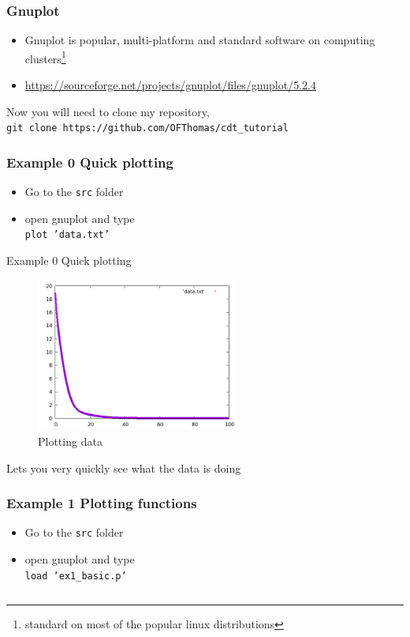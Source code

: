 \documentclass{beamer}
\begin{document}
\begin{frame}
\frametitle{Gnuplot} 
\begin{itemize}
	\item Gnuplot is popular, multi-platform and standard software on computing clusters\footnote{standard on most of the popular linux distributions} 
    \item \url{https://sourceforge.net/projects/gnuplot/files/gnuplot/5.2.4}
\end{itemize}
Now you will need to clone my repository,\\ \texttt{git clone https://github.com/OFThomas/cdt\_tutorial} 
\end{frame}

\begin{frame}[fragile]
    \frametitle{Example 0 Quick plotting}
\begin{itemize}
	\item Go to the \texttt{src} folder
    \item open gnuplot and type \\ \texttt{plot 'data.txt'}
\end{itemize}
\end{frame}

\begin{frame}{Example 0 Quick plotting}
    \begin{figure}
	\centering
	\includegraphics[width=0.6\textwidth]{src/data.png}
	\caption{Plotting data}
	\label{fig:function}
\end{figure}
Lets you very quickly see what the data is doing
\end{frame}

\begin{frame}[fragile]
    \frametitle{Example 1 Plotting functions}
\begin{itemize}
	\item Go to the \texttt{src} folder
    \item open gnuplot and type \\ \texttt{load 'ex1\_basic.p'}
\end{itemize}
\inputminted[fontsize=\small]{bash}{src/ex1_basic.p}
\end{frame}
\end{document}

